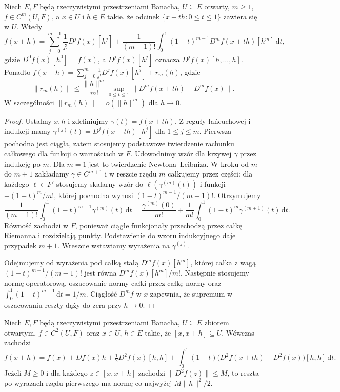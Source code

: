 \begin{twierdzenie}
\label{thm:taylor15}
Niech $E,F$ będą rzeczywistymi przestrzeniami Banacha, $U\subseteq E$ otwarty, $m\ge1$, $f\in C^m(U,F)$, a $x\in U$ i $h\in E$ takie, że odcinek $\{x+th:0\le t\le1\}$ zawiera się w $U$. Wtedy
\[
 f(x+h)=\sum_{j=0}^{m-1}\frac1{j!}D^jf(x)[h^j]
 +\frac1{(m-1)!}\int_0^1(1-t)^{m-1}D^mf(x+th)[h^m] \,\mathrm dt,
\]
gdzie $D^0f(x)[h^0]=f(x)$, a $D^jf(x)[h^j]$ oznacza $D^jf(x)[h,\ldots,h]$. Ponadto
$f(x+h)=\sum_{j=0}^{m}\frac1{j!}D^jf(x)[h^j]+r_m(h)$, gdzie
\[
\|r_m(h)\|\le \frac{\|h\|^m}{m!}\sup_{0\le t\le1}\|D^mf(x+th)-D^mf(x)\|.
\]
W szczególności $\|r_m(h)\|=o(\|h\|^m)$ dla $h\to0$.
\end{twierdzenie}
\begin{proof}
Ustalmy $x,h$ i zdefiniujmy $\gamma(t)=f(x+th)$. Z reguły łańcuchowej i indukcji mamy $\gamma^{(j)}(t)=D^jf(x+th)[h^j]$ dla $1\le j\le m$. Pierwsza pochodna jest ciągła, zatem stosujemy podstawowe twierdzenie rachunku całkowego dla funkcji o wartościach w $F$. Udowodnimy wzór dla krzywej $\gamma$ przez indukcję po $m$. Dla $m=1$ jest to twierdzenie Newtona--Leibniza. W kroku od $m$ do $m+1$ zakładamy $\gamma\in C^{m+1}$ i w reszcie rzędu $m$ całkujemy przez części: dla każdego $\ell\in F'$ stosujemy skalarny wzór do $\ell(\gamma^{(m)}(t))$ i funkcji $-(1-t)^m/m!$, której pochodna wynosi $(1-t)^{m-1}/(m-1)!$. Otrzymujemy
\[
 \frac1{(m-1)!}\int_0^1(1-t)^{m-1}\gamma^{(m)}(t)\,\mathrm dt
 =\frac{\gamma^{(m)}(0)}{m!}
 +\frac1{m!}\int_0^1(1-t)^m\gamma^{(m+1)}(t)\,\mathrm dt .
\]
Równość zachodzi w $F$, ponieważ ciągłe funkcjonały przechodzą przez całkę Riemanna i rozdzielają punkty. Podstawienie do wzoru indukcyjnego daje przypadek $m+1$. Wreszcie wstawiamy wyrażenia na $\gamma^{(j)}$.

Odejmujemy od wyrażenia pod całką stałą $D^mf(x)[h^m]$, której całka z wagą $(1-t)^{m-1}/(m-1)!$ jest równa $D^mf(x)[h^m]/m!$. Następnie stosujemy normę operatorową, oszacowanie normy całki przez całkę normy oraz $\int_0^1(1-t)^{m-1}\,\mathrm dt=1/m$. Ciągłość $D^mf$ w $x$ zapewnia, że supremum w oszacowaniu reszty dąży do zera przy $h\to0$.
\end{proof}

\begin{wniosek}
\label{cor:taylor2-15}
Niech $E,F$ będą rzeczywistymi przestrzeniami Banacha, $U\subseteq E$ zbiorem otwartym, $f\in C^2(U,F)$ oraz $x\in U$, $h\in E$ takie, że $[x,x+h]\subseteq U$. Wówczas zachodzi
\[
 f(x+h)=f(x)+Df(x)h+\tfrac12D^2f(x)[h,h]
 +\int_0^1(1-t)\bigl(D^2f(x+th)-D^2f(x)\bigr)[h,h] \,\mathrm dt.
\]
Jeżeli $M\ge0$ i dla każdego $z\in[x,x+h]$ zachodzi $\|D^2f(z)\|\le M$, to reszta po wyrazach rzędu pierwszego ma normę co najwyżej $M\|h\|^2/2$.
\end{wniosek}


